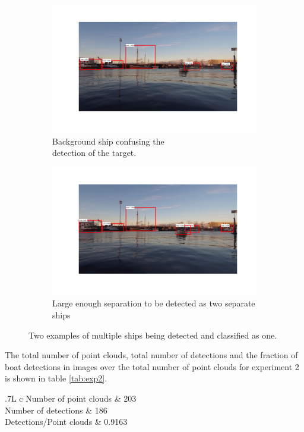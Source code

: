 \begin{figure}[H]
	\centering
	\begin{subfigure}[t]{.5\linewidth}
		\centering
		\includegraphics[width=\linewidth]{fig/exp_2_problem.png}
		\caption{Background ship confusing the\\ detection of the target.}
		\label{fig:sub_ex2_issue}
	\end{subfigure}%
	\begin{subfigure}[t]{.5\linewidth}
		\centering
		\includegraphics[width=\linewidth]{fig/exp2_past_problem.png}
		\caption{Large enough separation to be detected as two separate ships}
		\label{fig:sub_ex2_issue2}
	\end{subfigure}
	\caption{Two examples of multiple ships being detected and classified as one.}
	\label{fig:issues_ex2}
\end{figure}
The total number of point clouds, total number of detections and the fraction of boat detections in images over the total number of point clouds for experiment 2 is shown in table \ref{tab:exp2}.
\begin{table}[H]
	\centering
	\begin{tabularx}{.7\linewidth}{L c}
		\toprule
		Number of point clouds & 203\\
		\midrule
		Number of detections & 186\\
		\midrule
		Detections/Point clouds & 0.9163 \\
		\bottomrule
	\end{tabularx}
	\caption{Data from experiment 2.}
	\label{tab:exp2}
\end{table}
